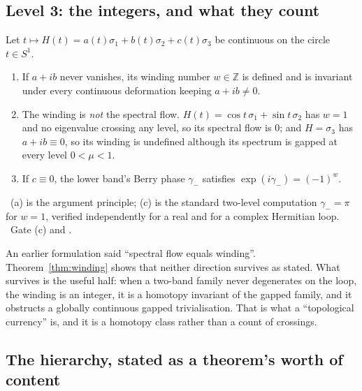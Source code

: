 \subsection{Level 3: the integers, and what they count}

\begin{theorem}\label{thm:winding}
Let $t\mapsto H(t)=a(t)\sigma_1+b(t)\sigma_2+c(t)\sigma_3$ be continuous on the circle
$t\in S^1$.
\begin{enumerate}[label=(\alph*)]
\item If $a+ib$ never vanishes, its winding number $w\in\mathbb{Z}$ is defined and is invariant
under every continuous deformation keeping $a+ib\neq0$.
\item The winding is \emph{not} the spectral flow. $H(t)=\cos t\,\sigma_1+\sin t\,\sigma_2$ has
$w=1$ and no eigenvalue crossing any level, so its spectral flow is $0$; and $H=\sigma_3$ has
$a+ib\equiv0$, so its winding is undefined although its spectrum is gapped at every level
$0<\mu<1$.
\item If $c\equiv0$, the lower band's Berry phase $\gamma_-$ satisfies
$\exp(i\gamma_-)=(-1)^w$.
\end{enumerate}
\T\ (a) is the argument principle; (c) is the standard two-level computation
$\gamma_-=\pi$ for $w=1$, verified independently for a real and for a complex Hermitian loop.
\V\ Gate  (c) and .
\end{theorem}

\begin{remark}\label{rem:currency}
An earlier formulation said ``spectral flow equals winding''. Theorem~\ref{thm:winding} shows
that neither direction survives as stated. What survives is the useful half: when a two-band
family never degenerates on the loop, the winding is an integer, it is a homotopy invariant of
the gapped family, and it obstructs a globally continuous gapped trivialisation. That is what a
``topological currency'' is, and it is a homotopy class rather than a count of crossings.
\end{remark}

\subsection{The hierarchy, stated as a theorem's worth of content}

